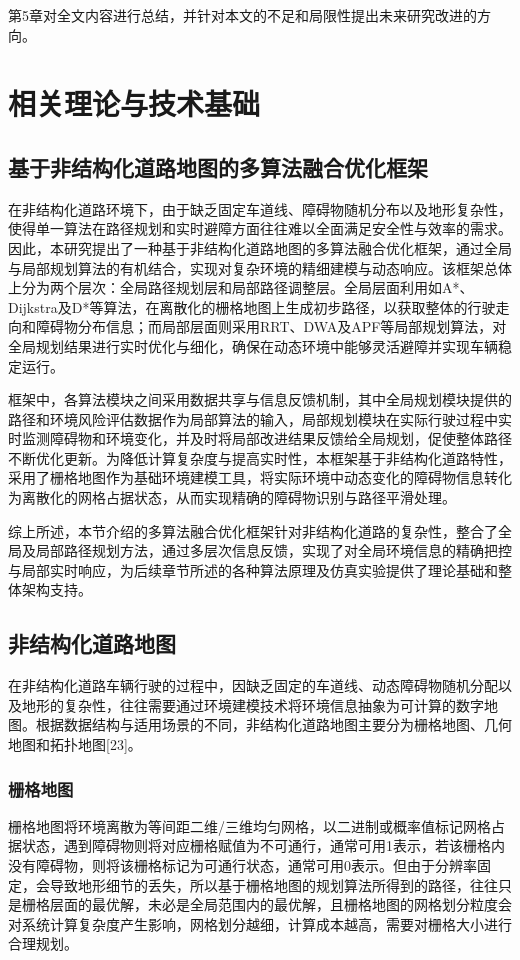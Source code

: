 \documentclass[lettersize,journal]{IEEEtran}
\begin{document}
第5章对全文内容进行总结，并针对本文的不足和局限性提出未来研究改进的方向。

\section{相关理论与技术基础}
\subsection{基于非结构化道路地图的多算法融合优化框架}


在非结构化道路环境下，由于缺乏固定车道线、障碍物随机分布以及地形复杂性，使得单一算法在路径规划和实时避障方面往往难以全面满足安全性与效率的需求。因此，本研究提出了一种基于非结构化道路地图的多算法融合优化框架，通过全局与局部规划算法的有机结合，实现对复杂环境的精细建模与动态响应。该框架总体上分为两个层次：全局路径规划层和局部路径调整层。全局层面利用如A*、Dijkstra及D*等算法，在离散化的栅格地图上生成初步路径，以获取整体的行驶走向和障碍物分布信息；而局部层面则采用RRT、DWA及APF等局部规划算法，对全局规划结果进行实时优化与细化，确保在动态环境中能够灵活避障并实现车辆稳定运行。

框架中，各算法模块之间采用数据共享与信息反馈机制，其中全局规划模块提供的路径和环境风险评估数据作为局部算法的输入，局部规划模块在实际行驶过程中实时监测障碍物和环境变化，并及时将局部改进结果反馈给全局规划，促使整体路径不断优化更新。为降低计算复杂度与提高实时性，本框架基于非结构化道路特性，采用了栅格地图作为基础环境建模工具，将实际环境中动态变化的障碍物信息转化为离散化的网格占据状态，从而实现精确的障碍物识别与路径平滑处理。

综上所述，本节介绍的多算法融合优化框架针对非结构化道路的复杂性，整合了全局及局部路径规划方法，通过多层次信息反馈，实现了对全局环境信息的精确把控与局部实时响应，为后续章节所述的各种算法原理及仿真实验提供了理论基础和整体架构支持。

\subsection{非结构化道路地图}

在非结构化道路车辆行驶的过程中，因缺乏固定的车道线、动态障碍物随机分配以及地形的复杂性，往往需要通过环境建模技术将环境信息抽象为可计算的数字地图。根据数据结构与适用场景的不同，非结构化道路地图主要分为栅格地图、几何地图和拓扑地图[23]。

\subsubsection{栅格地图}
栅格地图将环境离散为等间距二维/三维均匀网格，以二进制或概率值标记网格占据状态，遇到障碍物则将对应栅格赋值为不可通行，通常可用1表示，若该栅格内没有障碍物，则将该栅格标记为可通行状态，通常可用0表示。但由于分辨率固定，会导致地形细节的丢失，所以基于栅格地图的规划算法所得到的路径，往往只是栅格层面的最优解，未必是全局范围内的最优解，且栅格地图的网格划分粒度会对系统计算复杂度产生影响，网格划分越细，计算成本越高，需要对栅格大小进行合理规划。
\end{document}
